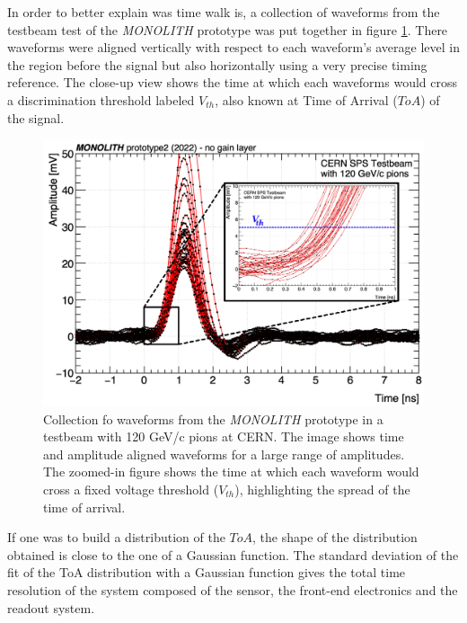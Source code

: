 	In order to better explain was time walk is, a collection of waveforms from the testbeam test of the \textit{MONOLITH} prototype was put together in figure \ref{im:waveforms_timeresolution}. There waveforms were aligned vertically with respect to each waveform's average level in the region before the signal but also horizontally using a very precise timing reference. The close-up view shows the time at which each waveforms would cross a discrimination threshold labeled $V_{th}$, also known at Time of Arrival ($ToA$) of the signal.
	\begin{figure}[h]
		\centering
		\includegraphics[width=0.85\linewidth]{files/waveforms_timeresolution}
		\caption{Collection fo waveforms from the \textit{MONOLITH} prototype in a testbeam with 120 GeV/c pions at CERN. The image shows time and amplitude aligned waveforms for a large range of amplitudes. The zoomed-in figure shows the time at which each waveform would cross a fixed voltage threshold ($V_{th}$), highlighting the spread of the time of arrival.}
		\label{im:waveforms_timeresolution}
	\end{figure} 
	
	If one was to build a distribution of the $ToA$, the shape of the distribution obtained is close to the one of a Gaussian function. The standard deviation of the fit of the ToA distribution with a Gaussian function gives the total time resolution of the system composed of the sensor, the front-end electronics and the readout system. 
	

